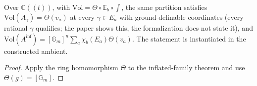\begin{theorem}
\label{inflated-vol}
\leanok
{}
Over $\mathbb C((t))$, with $\mathrm{Vol}=\Theta\circ\mathbb E_b\circ\int$, the same partition satisfies $\mathrm{Vol}(A_\gamma)=\Theta(v_a)$ at every $\gamma\in E_a$ with ground-definable coordinates (every rational $\gamma$ qualifies; the paper shows this, the formalization does not state it), and $\mathrm{Vol}(A^{\mathrm{inf}})=[\mathbb G_m]^n\sum_a\chi_b(E_a)\Theta(v_a)$. The statement is instantiated in the constructed ambient.
\end{theorem}

\begin{proof}
Apply the ring homomorphism $\Theta$ to the inflated-family theorem and use $\Theta(g)=[\mathbb G_m]$.
\end{proof}
